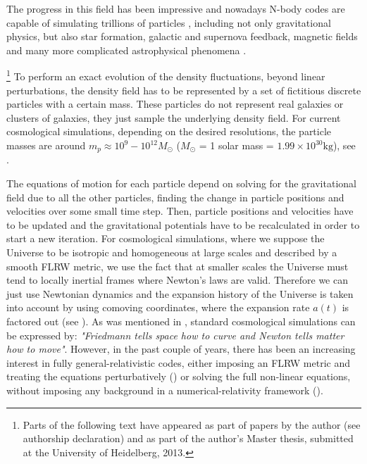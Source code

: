 The progress in this field has been impressive and nowadays N-body codes are capable
of simulating trillions of particles , including not only 
gravitational physics, but also star formation, galactic and supernova feedback, magnetic fields and
many more complicated astrophysical phenomena .

\footnote{Parts of the following text have appeared as part of papers by the author (see authorship declaration)
and as part of the author's Master thesis, submitted at the University of Heidelberg, 2013.}
To perform an exact evolution of the density fluctuations, beyond
linear perturbations, the density field has to be represented by a
set of fictitious discrete particles with a certain mass. These particles
do not represent real galaxies or clusters of galaxies, they just
sample the underlying density field. For current cosmological simulations,
depending on the desired resolutions, the particle masses are around
$m_{p}\approx10^{9}-10^{12}M_{\odot}$ ($M_{\odot}$ = 1 solar mass = $1.99 \times 10^{30} \mathrm{kg}$), see \citet{kuhlen_numerical_2012}.


The equations of motion for each particle depend on solving for the
gravitational field due to all the other particles, finding the change
in particle positions and velocities over some small time step. Then,
particle positions and velocities have to be updated and the gravitational
potentials have to be recalculated in order to start a new iteration. For cosmological
simulations, where we suppose the Universe to be isotropic and homogeneous
at large scales and described by a smooth FLRW metric, we use the
fact that at smaller scales the Universe must tend to locally inertial
frames where Newton's laws are valid. Therefore we can just use Newtonian
dynamics and the expansion history of the Universe is taken into account
by using comoving coordinates, where the expansion rate $a(t)$ is
factored out (see \citet{peacock_cosmological_1999,dehnen_n-body_2011}).
As was mentioned in , standard cosmological simulations
can be expressed by:
\emph{"Friedmann tells space how to curve and Newton tells matter how to move"}.
However, in the past couple of years, there has been an increasing interest
in fully general-relativistic codes, either imposing an FLRW metric and treating the equations
perturbatively () or solving the full non-linear 
equations, without imposing any background in a numerical-relativity framework ().



